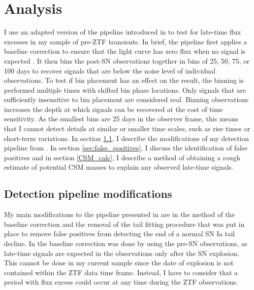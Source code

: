 \documentclass[a4paper,oneside,12pt, class=Latex/Classes/PhDthesisPSnPDF, crop=false]{standalone}
\begin{document}
\section{Analysis}
\label{Pre-ZTF_analysis}
I use an adapted version of the pipeline introduced in \citet{Terwel_2024_paper1} to test for late-time flux excesses in my sample of pre-ZTF transients. In brief, the pipeline first applies a baseline correction to ensure that the light curve has zero flux when no signal is expected \citep[e.g.][]{Yao_baseline_corr, Miller_baseline_corr}. It then bins the post-SN observations together in bins of 25, 50, 75, or 100 days to recover signals that are below the noise level of individual observations. To test if bin placement has an effect on the result, the binning is performed multiple times with shifted bin phase locations. Only signals that are sufficiently insensitive to bin placement are considered real. Binning observations increases the depth at which signals can be recovered at the cost of time sensitivity. As the smallest bins are 25 days in the observer frame, this means that I cannot detect details at similar or smaller time scales, such as rise times or short-term variations. In section \ref{sec:Pipeline_modifications}, I describe the modifications of my detection pipeline from \cite{Terwel_2024_paper1}. In section \ref{sec:false_positives}, I discuss the identification of false positives and in section \ref{CSM_calc}, I describe a method of obtaining a rough estimate of potential CSM masses to explain any observed late-time signals.

\subsection{Detection pipeline modifications}
\label{sec:Pipeline_modifications}
My main modifications to the pipeline presented in \citet{Terwel_2024_paper1} are in the method of the baseline correction and the removal of the tail fitting procedure that was put in place to remove false positives from detecting the end of a normal SN Ia tail decline. In \citet{Terwel_2024_paper1} the baseline correction was done by using the pre-SN observations, as late-time signals are expected in the observations only after the SN explosion. This cannot be done in my current sample since the date of explosion is not contained within the ZTF data time frame. Instead, I have to consider that a period with flux excess could occur at any time during the ZTF observations.
\end{document}
